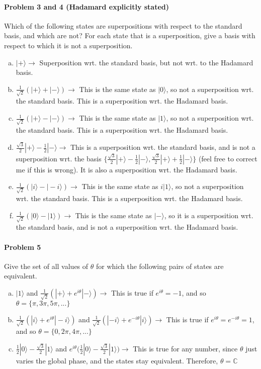 \documentclass[12pt]{article}
\theoremstyle{mytheor}
\begin{document}
\paragraph{Problem 3 and 4 (Hadamard explicitly stated)} Which of the following states are superpositions with respect to the standard basis, and which are not? For each state that is a superposition, give a basis with respect to which it is not a superposition.
\begin{enumerate}[a)] %
\item $|+\rangle \rightarrow$ Superposition wrt. the standard basis, but not wrt. to the Hadamard basis.
\item $\frac{1}{\sqrt{2}}(|+\rangle + |-\rangle) \rightarrow$ This is the same state as $|0\rangle$, so not a superposition wrt. the standard basis. This is a superposition wrt. the Hadamard basis.
\item $\frac{1}{\sqrt{2}}(|+\rangle - |-\rangle) \rightarrow$ This is the same state as $|1\rangle$, so not a superposition wrt. the standard basis. This is a superposition wrt. the Hadamard basis.
\item $\frac{\sqrt{3}}{2}|+\rangle - \frac{1}{2}|-\rangle \rightarrow$ This is a superposition wrt. the standard basis, and is not a superposition wrt. the basis $\{\frac{\sqrt{3}}{2}|+\rangle - \frac{1}{2}|-\rangle,\frac{\sqrt{3}}{2}|+\rangle + \frac{1}{2}|-\rangle\}$ (feel free to correct me if this is wrong). It is also a superposition wrt. the Hadamard basis.
\item $\frac{1}{\sqrt{2}}(|i\rangle - |-i\rangle) \rightarrow$ This is the same state as $i|1\rangle$, so not a superposition wrt. the standard basis. This is a superposition wrt. the Hadamard basis.
\item $\frac{1}{\sqrt{2}}(|0\rangle - |1\rangle) \rightarrow$ This is the same state as $|-\rangle$, so it is a superposition wrt. the standard basis, and is not a superposition wrt. the Hadamard basis.
\end{enumerate}

\paragraph{Problem 5} Give the set of all values of $\theta$ for which the following pairs of states are equivalent.
\begin{enumerate}[a)] %
\item $|1\rangle$ and $\frac{1}{\sqrt{2}}(|+\rangle + e^{i\theta}|-\rangle)\rightarrow$ This is true if $e^{i\theta} = -1$, and so $\theta = \{\pi, 3\pi, 5\pi, ...\}$
\item $\frac{1}{\sqrt{2}}(|i\rangle + e^{i\theta}|-i\rangle)$ and $\frac{1}{\sqrt{2}}(|-i\rangle + e^{-i\theta}|i\rangle)\rightarrow$ This is true if $e^{i\theta} = e^{-i\theta} = 1$, and so $\theta = \{0, 2\pi, 4\pi, ...\}$
\item $\frac{1}{2}|0\rangle - \frac{\sqrt{3}}{2}|1\rangle$ and $e^{i\theta}\Big(\frac{1}{2}|0\rangle - \frac{\sqrt{3}}{2}|1\rangle\Big) \rightarrow$ This is true for any number, since $\theta$ just varies the global phase, and the states stay equivalent. Therefore, $\theta = \mathbb{C}$
\end{enumerate}
\end{document}

